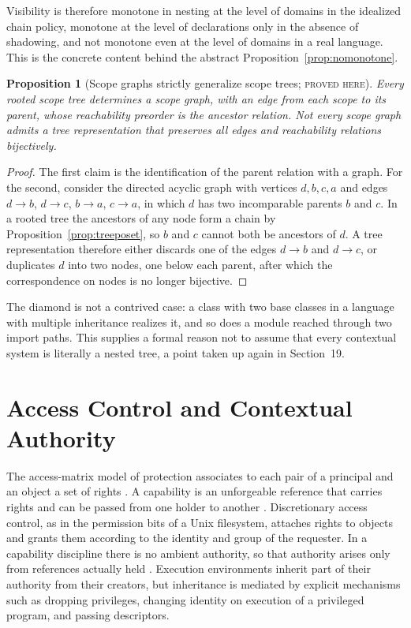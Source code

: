\documentclass[11pt]{article}
\newtheorem{proposition}[theorem]{Proposition}
\theoremstyle{definition}
\theoremstyle{remark}
\newcommand{\stN}{\textsc{proved here}}
\begin{document}
Visibility is therefore monotone in nesting at the level of domains in the idealized chain policy, monotone at the level of declarations only in the absence of shadowing, and not monotone even at the level of domains in a real language. This is the concrete content behind the abstract Proposition~\ref{prop:nomonotone}.

\begin{proposition}[Scope graphs strictly generalize scope trees; \stN]\label{prop:graphgen}
Every rooted scope tree determines a scope graph, with an edge from each scope to its parent, whose reachability preorder is the ancestor relation. Not every scope graph admits a tree representation that preserves all edges and reachability relations bijectively.
\end{proposition}
\begin{proof}
The first claim is the identification of the parent relation with a graph. For the second, consider the directed acyclic graph with vertices $d,b,c,a$ and edges $d\to b$, $d\to c$, $b\to a$, $c\to a$, in which $d$ has two incomparable parents $b$ and $c$. In a rooted tree the ancestors of any node form a chain by Proposition~\ref{prop:treeposet}, so $b$ and $c$ cannot both be ancestors of $d$. A tree representation therefore either discards one of the edges $d\to b$ and $d\to c$, or duplicates $d$ into two nodes, one below each parent, after which the correspondence on nodes is no longer bijective.
\end{proof}

The diamond is not a contrived case: a class with two base classes in a language with multiple inheritance realizes it, and so does a module reached through two import paths. This supplies a formal reason not to assume that every contextual system is literally a nested tree, a point taken up again in Section~19.

\section{Access Control and Contextual Authority}

The access-matrix model of protection associates to each pair of a principal and an object a set of rights \cite{lampson}. A capability is an unforgeable reference that carries rights and can be passed from one holder to another \cite{dennisvanhorn}. Discretionary access control, as in the permission bits of a Unix filesystem, attaches rights to objects and grants them according to the identity and group of the requester. In a capability discipline there is no ambient authority, so that authority arises only from references actually held \cite{capmyths}. Execution environments inherit part of their authority from their creators, but inheritance is mediated by explicit mechanisms such as dropping privileges, changing identity on execution of a privileged program, and passing descriptors.
\end{document}
